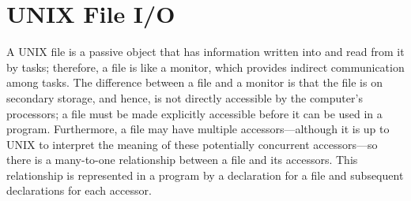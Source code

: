 \documentclass[openright,twoside]{report}
\begin{document}
\begin{comment}
\Textbf{WARNING:} \LGinlinetrue\LGbegin\lgrinde\L{\LB{\V{printf}}}\endlgrinde\LGend{}\index{printf@\LGinlinetrue\LGbegin\lgrinde\L{\LB{\V{printf}}}\endlgrinde\LGend{}}, \LGinlinetrue\LGbegin\lgrinde\L{\LB{\V{scanf}}}\endlgrinde\LGend{}\index{scanf@\LGinlinetrue\LGbegin\lgrinde\L{\LB{\V{scanf}}}\endlgrinde\LGend{}} and their derivatives are unsafe when used with user-level threading, as in \uC.
These stream routines use kernel-thread locking (\LGinlinetrue\LGbegin\lgrinde\L{\LB{\V{futex}}}\endlgrinde\LGend{}\index{futex@\LGinlinetrue\LGbegin\lgrinde\L{\LB{\V{futex}}}\endlgrinde\LGend{}}), which block kernel threads, to prevent interleaving of I/O.
However, the following simple example illustrates how a deadlock can occur (other complex scenarios are possible).
Assume a single kernel thread and two user-level threads calling \LGinlinetrue\LGbegin\lgrinde\L{\LB{\V{printf}}}\endlgrinde\LGend{}.
One user-level thread acquires the I/O lock and is time-sliced while performing \LGinlinetrue\LGbegin\lgrinde\L{\LB{\V{printf}}}\endlgrinde\LGend{}.
The other user-level thread then starts execution, calls \LGinlinetrue\LGbegin\lgrinde\L{\LB{\V{printf}}}\endlgrinde\LGend{}, and blocks the only kernel thread because it cannot acquire the I/O lock.
It does not help if the kernel lock is multiple acquisition, i.e., the lock owner can acquire it multiple times, because it then results in two user threads in the \LGinlinetrue\LGbegin\lgrinde\L{\LB{\V{printf}}}\endlgrinde\LGend{} critical section, corrupting the stream.
\end{comment}


\section{UNIX File I/O}

A UNIX file is a passive object that has information written into and read from it by tasks;
therefore, a file is like a monitor, which provides indirect communication among tasks.
The difference between a file and a monitor is that the file is on secondary storage, and hence, is not directly accessible by the computer's processors;
a file must be made explicitly accessible before it can be used in a program.
Furthermore, a file may have multiple accessors---although it is up to UNIX to interpret the meaning of these potentially concurrent accessors---so there is a many-to-one relationship between a file and its accessors.
This relationship is represented in a \uC program by a declaration for a file and subsequent declarations for each accessor.
\end{document}
